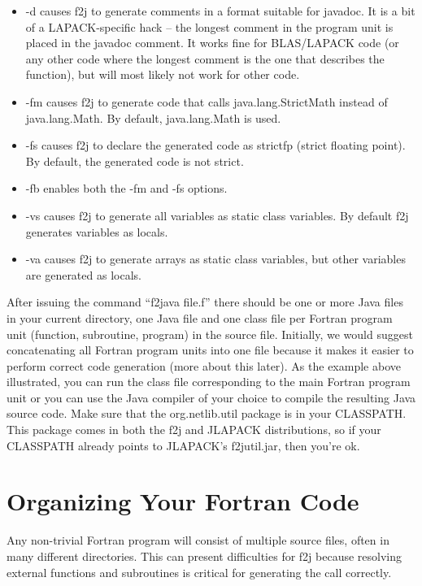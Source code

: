\documentclass[11pt]{article}
\begin{document}
\begin{itemize}
\item -d causes f2j to generate comments in a format suitable for javadoc.  It is a
  bit of a LAPACK-specific hack -- the longest comment in the program unit is
  placed in the javadoc comment.  It works fine for BLAS/LAPACK code (or any
  other code where the longest comment is the one that describes the function),
  but will most likely not work for other code.

\item -fm causes f2j to generate code that calls java.lang.StrictMath
  instead of java.lang.Math.  By default, java.lang.Math is used.

\item -fs causes f2j to declare the generated code as strictfp (strict
  floating point).  By default, the generated code is not strict.

\item -fb enables both the -fm and -fs options.

\item -vs causes f2j to generate all variables as static class
  variables.  By default f2j generates variables as locals.

\item -va causes f2j to generate arrays as static class variables, but
  other variables are generated as locals.
\end{itemize}

After issuing the command ``f2java file.f'' there should be one or more Java
files in your current directory, one Java file and one class file per Fortran program unit
(function, subroutine, program) in the source file.  Initially, we would
suggest concatenating all Fortran program units into one file because it makes
it easier to perform correct code generation (more about this later).  As the
example above illustrated, you can run the class file corresponding to the main
Fortran program unit or you can use the Java compiler of your choice to compile
the resulting Java source code.  Make sure that the org.netlib.util package is
in your CLASSPATH.  This package comes in both the f2j and JLAPACK distributions,
so if your CLASSPATH already points to JLAPACK's f2jutil.jar, then you're ok.

\section{Organizing Your Fortran Code}

Any non-trivial Fortran program will consist of multiple source files, often
in many different directories.  This can present difficulties for f2j because 
resolving external functions and subroutines is critical for generating the
call correctly.  
\end{document}
